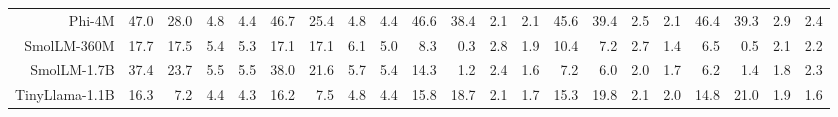 \begin{table}[t]
{\begin{tabular}{rrrrr|rrrr|rrrr|rrrr|rrrr}
Phi-4M & \cellcolor[HTML]{E4EDCC}47.0 & \cellcolor[HTML]{FEEDCC}28.0 & \cellcolor[HTML]{F8CECC}4.8 & \cellcolor[HTML]{F8CECC}4.4 & \cellcolor[HTML]{E3ECCC}46.7 & \cellcolor[HTML]{FEEBCC}25.4 & \cellcolor[HTML]{F9CFCC}4.8 & \cellcolor[HTML]{F8CFCC}4.4 & \cellcolor[HTML]{D3E9CC}46.6 & \cellcolor[HTML]{E4EDCC}38.4 & \cellcolor[HTML]{F9CFCC}2.1 & \cellcolor[HTML]{F8CFCC}2.1 & \cellcolor[HTML]{D4E9CC}45.6 & \cellcolor[HTML]{E1ECCC}39.4 & \cellcolor[HTML]{F8CECC}2.5 & \cellcolor[HTML]{F8CECC}2.1 & \cellcolor[HTML]{D3E9CC}46.4 & \cellcolor[HTML]{E2ECCC}39.3 & \cellcolor[HTML]{F9D0CC}2.9 & \cellcolor[HTML]{F9CFCC}2.4 \\
SmolLM-360M & \cellcolor[HTML]{FCDFCC}17.7 & \cellcolor[HTML]{FCDFCC}17.5 & \cellcolor[HTML]{F9CFCC}5.4 & \cellcolor[HTML]{F9CFCC}5.3 & \cellcolor[HTML]{FCE0CC}17.1 & \cellcolor[HTML]{FCE0CC}17.1 & \cellcolor[HTML]{F9D1CC}6.1 & \cellcolor[HTML]{F9CFCC}5.0 & \cellcolor[HTML]{FAD8CC}8.3 & \cellcolor[HTML]{F8CCCC}0.3 & \cellcolor[HTML]{F9D0CC}2.8 & \cellcolor[HTML]{F8CECC}1.9 & \cellcolor[HTML]{FBDBCC}10.4 & \cellcolor[HTML]{FAD6CC}7.2 & \cellcolor[HTML]{F8CFCC}2.7 & \cellcolor[HTML]{F8CDCC}1.4 & \cellcolor[HTML]{FAD5CC}6.5 & \cellcolor[HTML]{F8CCCC}0.5 & \cellcolor[HTML]{F8CECC}2.1 & \cellcolor[HTML]{F8CFCC}2.2 \\
SmolLM-1.7B & \cellcolor[HTML]{F5F0CC}37.4 & \cellcolor[HTML]{FDE7CC}23.7 & \cellcolor[HTML]{F9CFCC}5.5 & \cellcolor[HTML]{F9CFCC}5.5 & \cellcolor[HTML]{F2EFCC}38.0 & \cellcolor[HTML]{FDE6CC}21.6 & \cellcolor[HTML]{F9D0CC}5.7 & \cellcolor[HTML]{F9D0CC}5.4 & \cellcolor[HTML]{FCE1CC}14.3 & \cellcolor[HTML]{F8CDCC}1.2 & \cellcolor[HTML]{F9CFCC}2.4 & \cellcolor[HTML]{F8CECC}1.6 & \cellcolor[HTML]{FAD6CC}7.2 & \cellcolor[HTML]{F9D4CC}6.0 & \cellcolor[HTML]{F8CECC}2.0 & \cellcolor[HTML]{F8CDCC}1.7 & \cellcolor[HTML]{FAD5CC}6.2 & \cellcolor[HTML]{F8CDCC}1.4 & \cellcolor[HTML]{F8CECC}1.8 & \cellcolor[HTML]{F8CFCC}2.3 \\
TinyLlama-1.1B & \cellcolor[HTML]{FBDECC}16.3 & \cellcolor[HTML]{F9D2CC}7.2 & \cellcolor[HTML]{F8CECC}4.4 & \cellcolor[HTML]{F8CECC}4.3 & \cellcolor[HTML]{FBDECC}16.2 & \cellcolor[HTML]{F9D3CC}7.5 & \cellcolor[HTML]{F9CFCC}4.8 & \cellcolor[HTML]{F8CFCC}4.4 & \cellcolor[HTML]{FCE4CC}15.8 & \cellcolor[HTML]{FDE8CC}18.7 & \cellcolor[HTML]{F9CFCC}2.1 & \cellcolor[HTML]{F8CECC}1.7 & \cellcolor[HTML]{FCE2CC}15.3 & \cellcolor[HTML]{FDEACC}19.8 & \cellcolor[HTML]{F8CECC}2.1 & \cellcolor[HTML]{F8CECC}2.0 & \cellcolor[HTML]{FCE2CC}14.8 & \cellcolor[HTML]{FEEBCC}21.0 & \cellcolor[HTML]{F8CECC}1.9 & \cellcolor[HTML]{F8CECC}1.6 \\

\end{tabular}}
\end{table}
